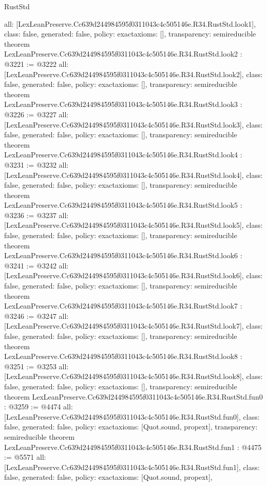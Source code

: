 \begin{lexlean}{RustStd}
\begin{coremodule}
{  all: [LexLeanPreserve.Cc639d244984595f0311043c4c505146e.R34.RustStd.look1],
  class: false,
  generated: false,
  policy: exact{axioms: []},
  transparency: semireducible
}
theorem LexLeanPreserve.Cc639d244984595f0311043c4c505146e.R34.RustStd.look2 : @3221 := @3222 {
  all: [LexLeanPreserve.Cc639d244984595f0311043c4c505146e.R34.RustStd.look2],
  class: false,
  generated: false,
  policy: exact{axioms: []},
  transparency: semireducible
}
theorem LexLeanPreserve.Cc639d244984595f0311043c4c505146e.R34.RustStd.look3 : @3226 := @3227 {
  all: [LexLeanPreserve.Cc639d244984595f0311043c4c505146e.R34.RustStd.look3],
  class: false,
  generated: false,
  policy: exact{axioms: []},
  transparency: semireducible
}
theorem LexLeanPreserve.Cc639d244984595f0311043c4c505146e.R34.RustStd.look4 : @3231 := @3232 {
  all: [LexLeanPreserve.Cc639d244984595f0311043c4c505146e.R34.RustStd.look4],
  class: false,
  generated: false,
  policy: exact{axioms: []},
  transparency: semireducible
}
theorem LexLeanPreserve.Cc639d244984595f0311043c4c505146e.R34.RustStd.look5 : @3236 := @3237 {
  all: [LexLeanPreserve.Cc639d244984595f0311043c4c505146e.R34.RustStd.look5],
  class: false,
  generated: false,
  policy: exact{axioms: []},
  transparency: semireducible
}
theorem LexLeanPreserve.Cc639d244984595f0311043c4c505146e.R34.RustStd.look6 : @3241 := @3242 {
  all: [LexLeanPreserve.Cc639d244984595f0311043c4c505146e.R34.RustStd.look6],
  class: false,
  generated: false,
  policy: exact{axioms: []},
  transparency: semireducible
}
theorem LexLeanPreserve.Cc639d244984595f0311043c4c505146e.R34.RustStd.look7 : @3246 := @3247 {
  all: [LexLeanPreserve.Cc639d244984595f0311043c4c505146e.R34.RustStd.look7],
  class: false,
  generated: false,
  policy: exact{axioms: []},
  transparency: semireducible
}
theorem LexLeanPreserve.Cc639d244984595f0311043c4c505146e.R34.RustStd.look8 : @3251 := @3253 {
  all: [LexLeanPreserve.Cc639d244984595f0311043c4c505146e.R34.RustStd.look8],
  class: false,
  generated: false,
  policy: exact{axioms: []},
  transparency: semireducible
}
theorem LexLeanPreserve.Cc639d244984595f0311043c4c505146e.R34.RustStd.fun0 : @3259 := @4474 {
  all: [LexLeanPreserve.Cc639d244984595f0311043c4c505146e.R34.RustStd.fun0],
  class: false,
  generated: false,
  policy: exact{axioms: [Quot.sound, propext]},
  transparency: semireducible
}
theorem LexLeanPreserve.Cc639d244984595f0311043c4c505146e.R34.RustStd.fun1 : @4475 := @5571 {
  all: [LexLeanPreserve.Cc639d244984595f0311043c4c505146e.R34.RustStd.fun1],
  class: false,
  generated: false,
  policy: exact{axioms: [Quot.sound, propext]},
}
\end{coremodule}
\end{lexlean}
